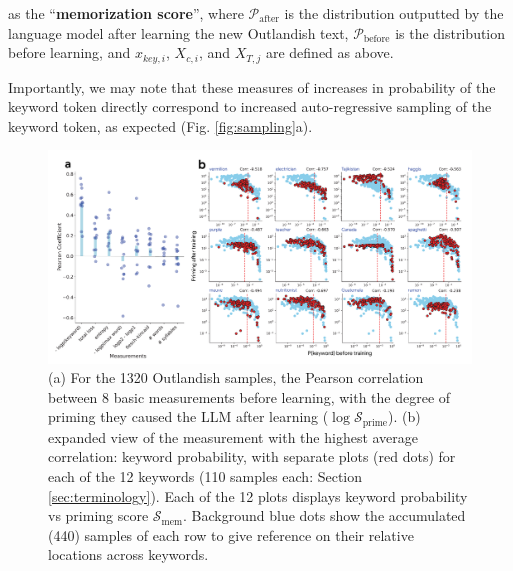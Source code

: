 \documentclass[11pt, a4paper, logo, copyright]{googledeepmind}
\theoremstyle{plain}
\theoremstyle{definition}
\theoremstyle{remark}
\begin{document}
as the ``\textbf{memorization score}'', where $\mathcal{P}_\text{after}$ is the distribution outputted by the language model after learning the new Outlandish text, $\mathcal{P}_\text{before}$ is the distribution before learning, and $x_{key, i}$, $X_{c, i}$, and $X_{T,j}$ are defined as above. 

Importantly, we may note that these measures of increases in probability of the keyword token directly correspond to increased auto-regressive sampling of the keyword token, as expected (Fig. \ref{fig:sampling}a).




\begin{figure}[h]
\vspace{0mm}
    \centering \includegraphics[scale=.295,clip]{figures/Measurements.pdf}
    \vspace{-5mm}
    \caption{(a) For the 1320 Outlandish samples, the Pearson correlation between 8 basic measurements before learning, with the degree of priming they caused the LLM after learning ($\log \mathcal{S}_\text{prime}$). (b) expanded view of the measurement with the highest average correlation: keyword probability, with separate plots (red dots) for each of the 12 keywords (110 samples each: Section \ref{sec:terminology}). Each of the 12 plots displays keyword probability vs priming score $\mathcal{S}_\text{mem}$. Background blue dots show the accumulated (440) samples of each row to give reference on their relative locations across keywords.} \label{fig:Measurements}
  \vspace{-0mm}
\end{figure}
\end{document}
